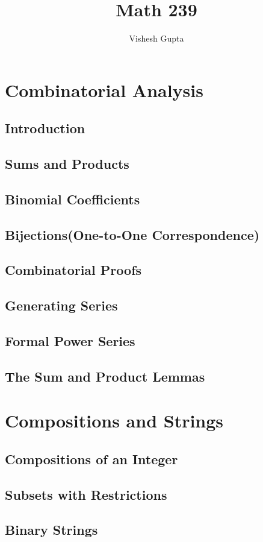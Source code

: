 \documentclass{book}
\title{Math 239}
\author{Vishesh Gupta}
\theoremstyle{nonumberplain}
\begin{document}
\maketitle
\tableofcontents 
\chapter{Combinatorial Analysis}
\section{Introduction}
\section{Sums and Products}
\section{Binomial Coefficients}
\section{Bijections(One-to-One Correspondence)}
\section{Combinatorial Proofs}
\section{Generating Series}
\section{Formal Power Series}
\section{The Sum and Product Lemmas}
\chapter{Compositions and Strings}
\section{Compositions of an Integer}
\section{Subsets with Restrictions}
\section{Binary Strings}
\end{document}
